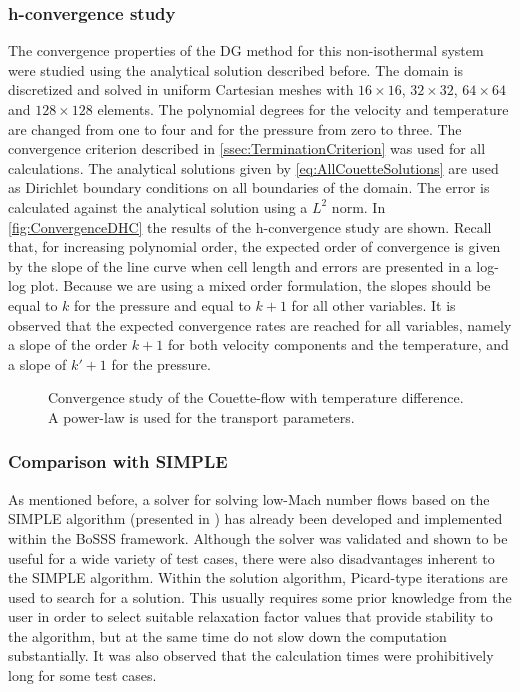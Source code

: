\subsubsection{h-convergence study}
The convergence properties of the DG method for this non-isothermal system were studied using the analytical solution described before. The domain is discretized and solved in uniform Cartesian meshes with $16\times16$, $32\times32$, $64\times64$ and $128\times128$ elements. The polynomial degrees for the velocity and temperature are changed from one to four and for the pressure from zero to three. The convergence criterion described in \cref{ssec:TerminationCriterion} was used for all calculations. The analytical solutions given by \cref{eq:AllCouetteSolutions} are used as Dirichlet boundary conditions on all boundaries of the domain. The error is calculated against the analytical solution using a $L^2$ norm. 
In \cref{fig:ConvergenceDHC} the results of the h-convergence study are shown.  Recall that, for increasing polynomial order, the expected order of convergence is given by the slope of the line curve when cell length and errors are presented in a log-log plot. Because we are using a mixed order formulation, the slopes should be equal to $k$ for the pressure and equal to $k+1$ for all other variables. It is observed that the expected convergence rates are reached for all variables, namely a slope of the order $k+1$ for both velocity components and the temperature, and a slope of $k'+1$ for the pressure.
\begin{figure}[t!]
	\centering
	\pgfplotsset{width=0.34\textwidth, compat=1.3}
	\caption{Convergence study of the Couette-flow with temperature difference. A power-law is used for the transport parameters.}\label{fig:ConvergenceCFTD}
\end{figure}
\subsubsection{Comparison with SIMPLE}
As mentioned before, a solver for solving low-Mach number flows based on the SIMPLE algorithm (presented in \cite{kleinHighorderDiscontinuousGalerkin2016}) has already been developed and implemented within the BoSSS framework.
Although the solver was validated and shown to be useful for a wide variety of test cases, there were also disadvantages inherent to the SIMPLE algorithm. Within the solution algorithm, Picard-type iterations are used to search for a solution. This usually requires some prior knowledge from the user in order to select suitable relaxation factor values that provide stability to the algorithm, but at the same time do not slow down the computation substantially.
It was also observed that the calculation times were prohibitively long for some test cases. 

